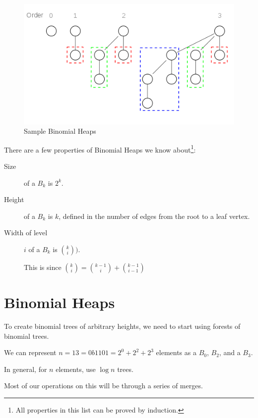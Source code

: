                 \begin{figure}[h]
                    \centering
                    \includegraphics{images/binomial_tree.png}
                    \caption{Sample Binomial Heaps}
                    \label{fig:binomial_heap}
                \end{figure}

                There are a few properties of Binomial Heaps we know about\footnote{All properties in this list can be proved by induction.}:
                \begin{description}
                    \item[Size] of a $B_k$ is $2^k$.
                    \item[Height] of a $B_k$ is $k$, defined in the number of edges from the root to a leaf vertex.
                    \item[Width of level] $i$ of a $B_k$ is $ {k \choose i})$.

                        This is since ${k \choose i} = {{k-1} \choose i} + {{k-1} \choose {i-1}}$
                \end{description}
            \section{Binomial Heaps} %
            \label{sec:binomial_heaps}
                To create binomial trees of arbitrary heights, we need to start using forests of binomial trees.

                We can represent $n = 13 = 0b1101 = 2^0 + 2^2 + 2^3$ elements as a $B_0$, $B_2$, and a $B_3$.

                In general, for $n$ elements, use $\log n$ trees.

                Most of our operations on this will be through a series of merges.

